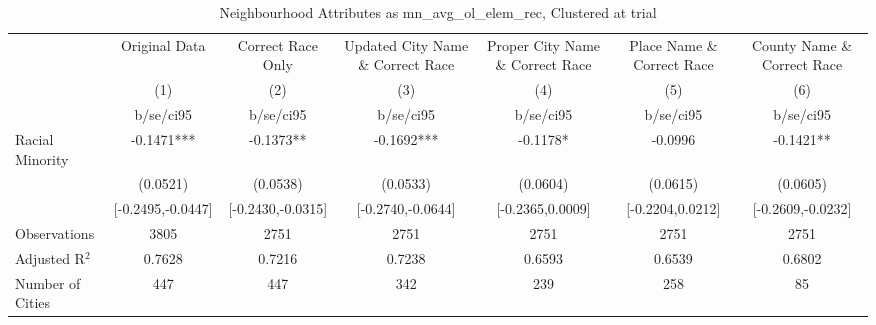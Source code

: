 \documentclass{article}
\begin{document}
\begin{table}[htbp]\centering
\def\sym#1{\ifmmode^{#1}\else\(^{#1}\)\fi}
\caption{Neighbourhood Attributes as mn\_avg\_ol\_elem\_rec, Clustered at trial}
\begin{tabular}{l*{6}{c}}
\toprule
                    &\multicolumn{1}{c}{Original Data}&\multicolumn{1}{c}{Correct Race Only}&\multicolumn{1}{c}{Updated City Name \& Correct Race}&\multicolumn{1}{c}{Proper City Name \& Correct Race}&\multicolumn{1}{c}{Place Name \& Correct Race}&\multicolumn{1}{c}{County Name \& Correct Race}\\\cmidrule(lr){2-2}\cmidrule(lr){3-3}\cmidrule(lr){4-4}\cmidrule(lr){5-5}\cmidrule(lr){6-6}\cmidrule(lr){7-7}
                    &\multicolumn{1}{c}{(1)}   &\multicolumn{1}{c}{(2)}   &\multicolumn{1}{c}{(3)}   &\multicolumn{1}{c}{(4)}   &\multicolumn{1}{c}{(5)}   &\multicolumn{1}{c}{(6)}   \\
                    &   b/se/ci95   &   b/se/ci95   &   b/se/ci95   &   b/se/ci95   &   b/se/ci95   &   b/se/ci95   \\
\midrule
Racial Minority     &     -0.1471***&     -0.1373** &     -0.1692***&     -0.1178*  &     -0.0996   &     -0.1421** \\
                    &    (0.0521)   &    (0.0538)   &    (0.0533)   &    (0.0604)   &    (0.0615)   &    (0.0605)   \\
                    &[-0.2495,-0.0447]   &[-0.2430,-0.0315]   &[-0.2740,-0.0644]   &[-0.2365,0.0009]   &[-0.2204,0.0212]   &[-0.2609,-0.0232]   \\
\midrule
Observations        &        3805   &        2751   &        2751   &        2751   &        2751   &        2751   \\
Adjusted R$^2$      &      0.7628   &      0.7216   &      0.7238   &      0.6593   &      0.6539   &      0.6802   \\
Number of Cities    &         447   &         447   &         342   &         239   &         258   &          85   \\
\bottomrule
\end{tabular}
\end{table}
\end{document}
